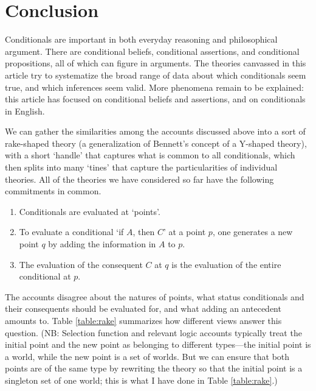  
\section{Conclusion}

Conditionals are important in both everyday reasoning and philosophical argument.  There are conditional beliefs, conditional assertions, and conditional propositions, all of which can figure in arguments.  The theories canvassed in this article try to systematize the broad range of data about which conditionals seem true, and which inferences seem valid.  More phenomena remain to be explained: this article has focused on conditional beliefs and assertions, and on conditionals in English.

We can gather the similarities among the accounts discussed above into a sort of rake-shaped theory (a generalization of Bennett's concept of a Y-shaped theory), with a short `handle' that captures what is common to all conditionals, which then splits into many `tines' that capture the particularities of individual theories.  All of the theories we have considered so far have the following commitments in common.
\begin{enumerate}
\item Conditionals are evaluated at `points'.

\item To evaluate a conditional `if $A$, then $C$' at a point $p$, one generates a new point $q$ by adding the information in $A$ to $p$.

\item The evaluation of the consequent $C$ at $q$ is the evaluation of the entire conditional at $p$.
\end{enumerate}
The accounts disagree about the natures of points, what status conditionals and their consequents should be evaluated for, and what adding an antecedent amounts to.  Table \ref{table:rake} summarizes how different views answer this question. (NB: Selection function and relevant logic accounts typically treat the initial point and the new point as belonging to different types---the initial point is a world, while the new point is a set of worlds. But we can ensure that both points are of the same type by rewriting the theory so that the initial point is a singleton set of one world; this is what I have done in Table \ref{table:rake}.)


